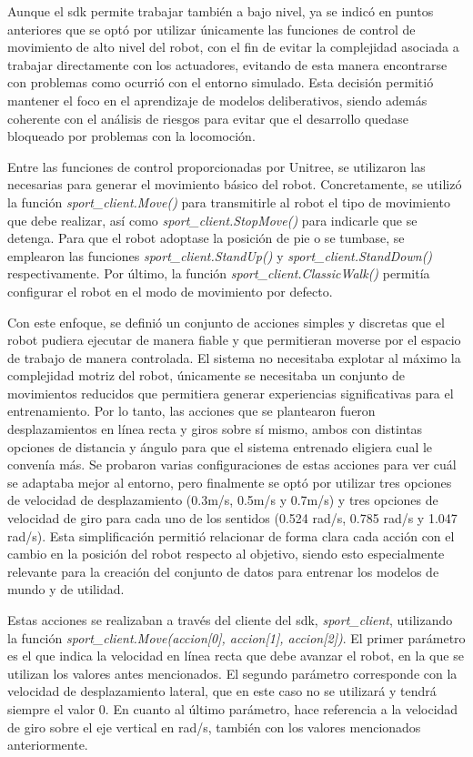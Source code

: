 Aunque el \Gls{sdk} permite trabajar también a bajo nivel, ya se indicó en puntos anteriores que se optó por utilizar únicamente las funciones de control de movimiento de alto nivel del 
robot, con el fin de evitar la complejidad asociada a trabajar directamente con los actuadores, evitando de esta manera encontrarse con problemas como ocurrió con el entorno simulado. Esta 
decisión permitió mantener el foco en el aprendizaje de modelos deliberativos, siendo además coherente con el análisis de riesgos para evitar que el desarrollo quedase bloqueado por problemas 
con la locomoción.

Entre las funciones de control proporcionadas por Unitree, se utilizaron las necesarias para generar el movimiento básico del robot. Concretamente, se utilizó la función 
\textit{sport\_client.Move()} para transmitirle al robot el tipo de movimiento que debe realizar, así como \textit{sport\_client.StopMove()} para indicarle que se detenga. Para que el robot 
adoptase la posición de pie o se tumbase, se emplearon las funciones \textit{sport\_client.StandUp()} y \textit{sport\_client.StandDown()} respectivamente. Por último, la 
función \textit{sport\_client.ClassicWalk()} permitía configurar el robot en el modo de movimiento por defecto.

Con este enfoque, se definió un conjunto de acciones simples y discretas que el robot pudiera ejecutar de manera fiable y que permitieran moverse por el espacio de trabajo de manera 
controlada. El sistema no necesitaba explotar al máximo la complejidad motriz del robot, únicamente se necesitaba un conjunto de movimientos reducidos que permitiera generar experiencias 
significativas para el entrenamiento. Por lo tanto, las acciones que se plantearon fueron desplazamientos en línea recta y giros sobre sí mismo, ambos con distintas opciones de distancia 
y ángulo para que el sistema entrenado eligiera cual le convenía más. Se probaron varias configuraciones de estas acciones para ver cuál se adaptaba mejor al entorno, pero finalmente se 
optó por utilizar tres opciones de velocidad de desplazamiento (0.3m/s, 0.5m/s y 0.7m/s) y tres opciones de velocidad de giro para cada uno de los sentidos (0.524 rad/s, 0.785 rad/s y 
1.047 rad/s). Esta simplificación permitió relacionar de forma clara cada acción con el cambio en la posición del robot respecto al objetivo, siendo esto especialmente relevante para 
la creación del conjunto de datos para entrenar los modelos de mundo y de utilidad.

Estas acciones se realizaban a través del cliente del \Gls{sdk}, \textit{sport\_client}, utilizando la función \textit{sport\_client.Move(accion[0], accion[1], accion[2])}. El primer parámetro es 
el que indica la velocidad en línea recta que debe avanzar el robot, en la que se utilizan los valores antes mencionados. El segundo parámetro corresponde con la velocidad de desplazamiento 
lateral, que en este caso no se utilizará y tendrá siempre el valor 0. En cuanto al último parámetro, hace referencia a la velocidad de giro sobre el eje vertical en rad/s, también con los 
valores mencionados anteriormente.

